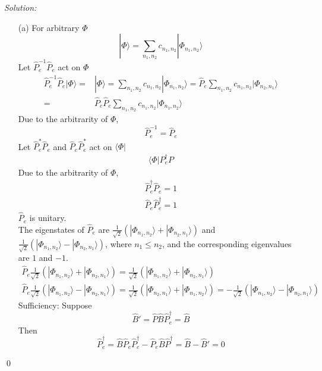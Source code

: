 \documentclass[12pt,a4paper]{article}
\newenvironment{sol}
    {\emph{Solution:}
    }
    {
    \qed
    }
\begin{document}
\begin{sol}
\begin{itemize}
\item[(a)] For arbitrary $\Phi$
\begin{equation}
|\Phi\rangle=\sum_{n_1,n_2}c_{n_1,n_2}|\Phi_{n_1,n_2}\rangle
\end{equation}
Let $\hat{P}_e^{-1}\hat{P}_e$ act on $\Phi$
\begin{align}
\nonumber\hat{P}_e^{-1}\hat{P}_e|\Phi\rangle=&|\Phi\rangle=\sum_{n_1,n_2}c_{n_1,n_2}|\Phi_{n_1,n_2}\rangle=\hat{P}_e\sum_{n_1,n_2}c_{n_1,n_2}|\Phi_{n_2,n_1}\rangle\\
=&\hat{P}_e\hat{P}_e\sum_{n_1,n_2}c_{n_1,n_2}|\Phi_{n_1,n_2}\rangle
\end{align}
Due to the arbitrarity of $\Phi$,
\begin{equation}
\hat{P}_e^{-1}=\hat{P}_e
\end{equation}
Let $\hat{P}_e^*\hat{P}_e$ and $\hat{P}_e\hat{P}_e^*$ act on $\langle\Phi|$
\begin{gather}
\langle\Phi|P_e^{\dagger}P
\end{gather}
Due to the arbitrarity of $\Phi$,
\begin{gather}
\hat{P}_e^{\dagger}\hat{P}_e=1\\
\hat{P}_e\hat{P}_e^{\dagger}=1
\end{gather}
$\hat{P}_e$ is unitary.\\
The eigenstates of $\hat{P}_e$ are $\frac{1}{\sqrt{2}}(|\Phi_{n_1,n_2}\rangle+|\Phi_{n_2,n_1}\rangle)$ and $\frac{1}{\sqrt{2}}(|\Phi_{n_1,n_2}\rangle-|\Phi_{n_2,n_1}\rangle)$, where $n_1\leq n_2$, and the corresponding eigenvalues are $1$ and $-1$.
\begin{gather}
\hat{P}_e\frac{1}{\sqrt{2}}(|\Phi_{n_1,n_2}\rangle+|\Phi_{n_2,n_1}\rangle)=\frac{1}{\sqrt{2}}(|\Phi_{n_1,n_2}\rangle+|\Phi_{n_2,n_1}\rangle)\\
\hat{P}_e\frac{1}{\sqrt{2}}(|\Phi_{n_1,n_2}\rangle-|\Phi_{n_2,n_1}\rangle)=\frac{1}{\sqrt{2}}(|\Phi_{n_2,n_1}\rangle+|\Phi_{n_1,n_2}\rangle)=-\frac{1}{\sqrt{2}}(|\Phi_{n_1,n_2}\rangle-|\Phi_{n_2,n_1}\rangle)
\end{gather}
Sufficiency: Suppose
\begin{equation}
\hat{B}'=\hat{P}\hat{B}\hat{P}_e^{\dagger}=\hat{B}
\end{equation}
Then
\begin{equation}
[\hat{B},\hat{P}_e]\hat{P}_e^{\dagger}=\hat{B}\hat{P}_e\hat{P}_e^{\dagger}-\hat{P}_e\hat{B}\hat{P}^{\dagger}=\hat{B}-\hat{B}'=0
\end{equation}

\end{itemize}
\end{sol}
\end{document}

